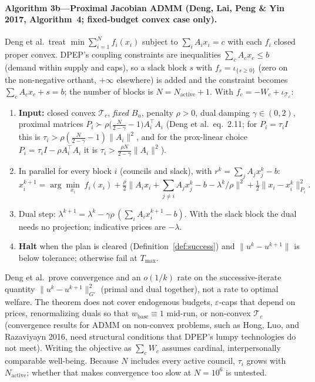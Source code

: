 \documentclass[10pt,twoside,openany]{book}
\theoremstyle{dpepstyle}
\begin{document}
\paragraph{Algorithm 3b---Proximal Jacobian ADMM (Deng, Lai, Peng \& Yin 2017, Algorithm~4; fixed-budget convex case only).}
Deng et al.\ treat $\min \sum_{i=1}^N f_i(x_i)$ subject to $\sum_i A_i x_i = c$ with each $f_i$ closed proper convex. DPEP's coupling constraints are inequalities $\sum_c A_c x_c \le b$ (demand within supply and caps), so a slack block $s$ with $f_s = \iota_{\{s \ge 0\}}$ (zero on the non-negative orthant, $+\infty$ elsewhere) is added and the constraint becomes $\sum_c A_c x_c + s = b$; the number of blocks is $N = N_{\text{active}} + 1$. With $f_c = -W_c + \iota_{\mathcal{T}_c}$:
\begin{enumerate}[leftmargin=1.6em,itemsep=1pt]
  \item \textbf{Input:} closed convex $\mathcal{T}_c$, \emph{fixed} $B_u$, penalty $\rho>0$, dual damping $\gamma\in(0,2)$, proximal matrices $P_i \succ \rho\big(\tfrac{N}{2-\gamma}-1\big)A_i^\top A_i$ (Deng et al.\ eq.~2.11; for $P_i=\tau_i I$ this is $\tau_i > \rho(\tfrac{N}{2-\gamma}-1)\|A_i\|^2$, and for the prox-linear choice $P_i = \tau_i I - \rho A_i^\top A_i$ it is $\tau_i > \tfrac{\rho N}{2-\gamma}\|A_i\|^2$).
  \item In parallel for every block $i$ (councils and slack), with $r^k = \sum_j A_j x_j^k - b$:
  \[
  x_i^{k+1} = \arg\min_{x_i} \; f_i(x_i) + \tfrac{\rho}{2}\Big\| A_i x_i + \textstyle\sum_{j\ne i} A_j x_j^k - b - \lambda^k/\rho \Big\|^2 + \tfrac12 \|x_i - x_i^k\|_{P_i}^2 .
  \]
  \item Dual step: $\lambda^{k+1} = \lambda^k - \gamma\rho\,(\sum_i A_i x_i^{k+1} - b)$. With the slack block the dual needs no projection; indicative prices are $-\lambda$.
  \item \textbf{Halt} when the plan is cleared (Definition~\ref{def:success}) and $\|u^k - u^{k+1}\|$ is below tolerance; otherwise fail at $T_{\max}$.
\end{enumerate}
Deng et al.\ prove convergence and an $o(1/k)$ rate on the successive-iterate quantity $\|u^k-u^{k+1}\|_{G'}^2$ (primal and dual together), not a rate to optimal welfare. The theorem does not cover endogenous budgets, $\varepsilon$-caps that depend on prices, renormalizing duals so that $w_{\text{base}}\equiv1$ mid-run, or non-convex $\mathcal{T}_c$ (convergence results for ADMM on non-convex problems, such as Hong, Luo, and Razaviyayn 2016, need structural conditions that DPEP's lumpy technologies do not meet). Writing the objective as $\sum_c W_c$ assumes cardinal, interpersonally comparable well-being. Because $N$ includes every active council, $\tau_i$ grows with $N_{\text{active}}$; whether that makes convergence too slow at $N=10^6$ is untested.
\end{document}
